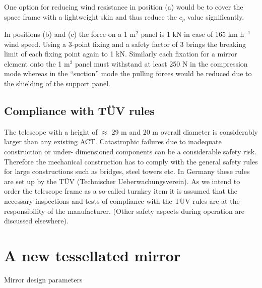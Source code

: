 One option for reducing wind resistance in position (a) would be to cover
the space frame with a lightweight skin and thus reduce the $c_p$ value
significantly. 

In positions (b) and (c) the force on a 1 m$^2$ panel is 1 kN in case of 165
km  h$^{-1}$ wind speed. Using a 3-point fixing and a safety factor of 3 brings the
breaking limit of each fixing point again to 1 kN. Similarly each fixation
for a mirror element onto the 1 m$^2$ panel must withstand at least 250 N in
the compression mode whereas in the ``suction'' mode the pulling forces
would be reduced due to the shielding of the support panel.

\subsection{Compliance with T\"{U}V rules}


\medskip The telescope with a height of $\approx $ 29 m and 20 m overall
diameter is considerably larger than any existing ACT. Catastrophic failures
due to inadequate construction or under- dimensioned components can be a
considerable safety risk. Therefore the mechanical construction has to
comply with the general safety rules for large constructions such as
bridges, steel towers etc. In Germany these rules are set up by the T\"{U}V
(Technischer Ueberwachungsverein). As we intend to order the telescope frame
as a so-called turnkey item it is assumed that the necessary inspections and
tests of compliance with the T\"{U}V rules are at the responsibility of the
manufacturer. (Other safety aspects during operation are discussed
elsewhere).

                      


\setcounter{chapter}{4} \setcounter{section}{1}

\section{A new tessellated mirror}


\medskip Mirror design parameters

